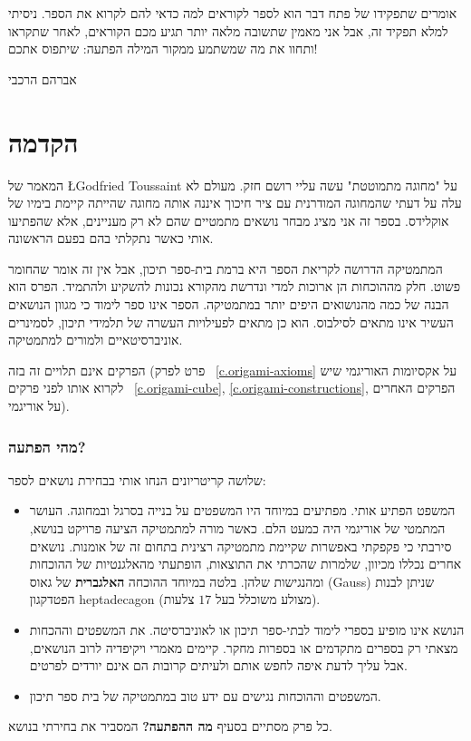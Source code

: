 אומרים שתפקידו של פתח דבר הוא לספר לקוראים למה כדאי להם לקרוא את הספר. ניסיתי למלא תפקיד זה, אבל אני מאמין שתשובה מלאה יותר תגיע מכם הקוראים, לאחר שתקראו ותחוו את מה שמשתמע ממקור המילה הפתעה: שיתפוס אתכם!

\bigskip

\begin{flushleft}
אברהם הרכבי
\end{flushleft}


\chapter*{הקדמה}
\thispagestyle{empty}

המאמר של 
\cite{toussaint} \L{Godfried Toussaint}
על "מחוגה מתמוטטת" עשה עליי רושם חזק. מעולם לא עלה על דעתי שהמחוגה המודרנית עם ציר חיכוך איננה אותה מחוגה שהייתה קיימת בימיו של אוקלידס. 
בספר זה אני מציג מבחר נושאים מתמטיים שהם לא רק מעניינים, אלא שהפתיעו אותי כאשר נתקלתי בהם בפעם הראשונה. 

המתמטיקה הדרושה לקריאת הספר היא ברמת בית-ספר תיכון, אבל אין זה אומר שהחומר פשוט. חלק מההוכחות הן ארוכות למדי ונדרשת מהקורא נכונות להשקיע ולהתמיד. הפרס הוא הבנה של כמה מהנושואים היפים יותר במתמטיקה. הספר אינו ספר לימוד כי מגוון הנושאים העשיר אינו מתאים לסילבוס. הוא כן מתאים לפעילויות העשרה של תלמידי תיכון, לסמינרים אוניברסיטאיים ולמורים למתמטיקה.


הפרקים אינם תלויים זה בזה (פרט לפרק~%
\ref{c.origami-axioms}
על אקסיומות האוריגמי שיש לקרוא אותו לפני פרקים~%
\ref{c.origami-cube}, \ref{c.origami-constructions},
הפרקים האחרים על אוריגמי).

\subsection*{מהי הפתעה?}

שלושה קריטריונים הנחו אותי בבחירת נושאים לספר:
\begin{itemize}
\item 
המשפט הפתיע אותי. מפתיעים במיוחד היו המשפטים על בנייה בסרגל ובמחוגה. העושר המתמטי של אוריגמי היה כמעט הלם. כאשר מורה למתמטיקה הציעה פרויקט בנושא, סירבתי כי פקפקתי באפשרות שקיימת מתמטיקה רצינית בתחום זה של אומנות. נושאים אחרים נכללו מכיוון, שלמרות שהכרתי את התוצאות, הופתעתי מהאלגנטיות של ההוכחות ומהנגישות שלהן. בלטה במיוחד ההוכחה 
\textbf{האלגברית}
של גאוס (Gauss) שניתן לבנות הפטדקגון heptadecagon (מצולע משוכלל בעל $17$ צלעות).

\item
הנושא אינו מופיע בספרי לימוד לבתי-ספר תיכון או לאוניברסיטה. את המשפטים וההכחות מצאתי רק בספרים מתקדמים או בספרות מחקר. קיימים מאמרי ויקיפדיה לרוב הנושאים, אבל עליך לדעת איפה לחפש אותם ולעיתים קרובות הם אינם יורדים לפרטים.

\item
המשפטים וההוכחות נגישים עם ידע טוב במתמטיקה של בית ספר תיכון.
\end{itemize}
כל פרק מסתיים בסעיף 
\textbf{מה ההפתעה?}
המסביר את בחירתי בנושא.

